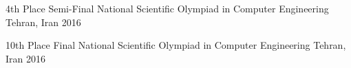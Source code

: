 



\begin{cvhonors}

  \cvhonor
    {4th Place} %
    {Semi-Final National Scientific Olympiad in Computer Engineering} %
    {Tehran, Iran} %
    {2016} %

  \cvhonor
    {10th Place} %
    {Final National Scientific Olympiad in Computer Engineering} %
    {Tehran, Iran} %
    {2016} %

\end{cvhonors}



